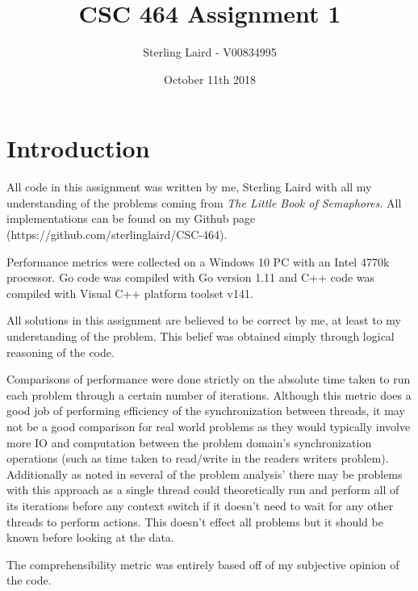 \documentclass[11pt]{article}
\title{CSC 464 Assignment 1}
\author{Sterling Laird - V00834995}
\date{October 11th 2018}
\begin{document}
\maketitle

\section{Introduction}
All code in this assignment was written by me, Sterling Laird with all my understanding of the problems coming from \textit{The Little Book of Semaphores}. All implementations can be found on my Github page \newline(https://github.com/sterlinglaird/CSC-464).\linebreak

\noindent Performance metrics were collected on a Windows 10 PC with an Intel 4770k processor. Go code was compiled with Go version 1.11 and C++ code was compiled with Visual C++ platform toolset v141.
\newline

\noindent All solutions in this assignment are believed to be correct by me, at least to my understanding of the problem. This belief was obtained simply through logical reasoning of the code. 
\newline

\noindent Comparisons of performance were done strictly on the absolute time taken to run each problem through a certain number of iterations. Although this metric does a good job of performing efficiency of the synchronization between threads, it may not be a good comparison for real world problems as they would typically involve more IO and computation between the problem domain's synchronization operations (such as time taken to read/write in the readers writers problem). Additionally as noted in several of the problem analysis' there may be problems with this approach as a single thread could theoretically run and perform all of its iterations before any context switch if it doesn't need to wait for any other threads to perform actions. This doesn't effect all problems but it should be known before looking at the data.
\newline

\noindent The comprehensibility metric was entirely based off of my subjective opinion of the code.

\pagebreak
\end{document}
